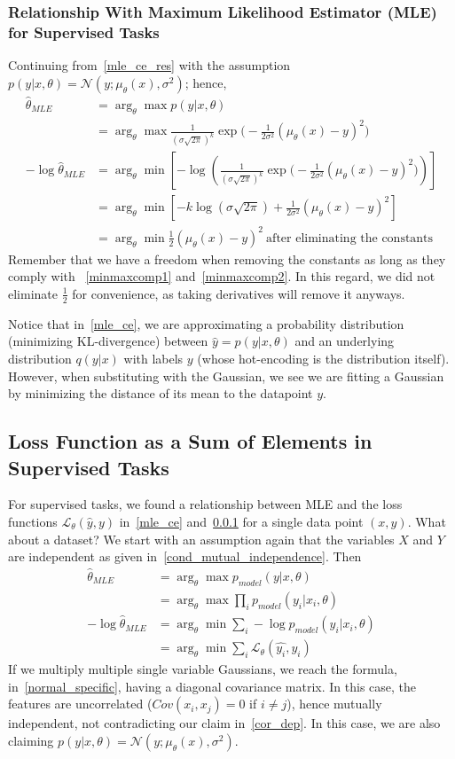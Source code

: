 \documentclass{article}
\numberwithin{equation}{subsection}
\begin{document}
\subsubsection{Relationship With Maximum Likelihood Estimator (MLE) for Supervised Tasks}
\label{mle_mse}
Continuing from~\ref{mle_ce_res} with the assumption $p(y|x,\theta) = \mathcal{N}(y; \mu_\theta(x),\sigma^2)$; hence, 
\begin{align}
    \hat{\theta}_{MLE} 
    &= \arg_\theta \max p(y|x,\theta)\\
    &= \arg_\theta \max \frac{1}{(\sigma\sqrt{2\pi})^k}\exp\Big(-\frac{1}{2\sigma^2}(\mu_\theta(x)-y)^2\Big)\\
    -\log\hat{\theta}_{MLE} &= \arg_\theta\min\left[-\log\left(\frac{1}{(\sigma\sqrt{2\pi})^k}\exp\Big(-\frac{1}{2\sigma^2}(\mu_\theta(x)-y)^2\Big)\right)\right]\\
    &= \arg_\theta\min[-k\log(\sigma\sqrt{2\pi}) + \frac{1}{2\sigma^2}(\mu_\theta(x)-y)^2]\\
    &= \arg_\theta \min\frac{1}{2}(\mu_\theta(x)-y)^2\ \text{after eliminating the constants}
    \label{mse_derivation_res1}
\end{align}
Remember that we have a freedom when removing the constants as long as they comply with ~\ref{minmaxcomp1} and~\ref{minmaxcomp2}. In this regard, we did not eliminate $\frac{1}{2}$ for convenience, as taking derivatives will remove it anyways. 

Notice that in~\ref{mle_ce}, we are approximating a probability distribution (minimizing KL-divergence) between $\hat{y} = p(y|x,\theta)$ and an underlying distribution $q(y|x)$ with labels $y$ (whose hot-encoding is the distribution itself). However, when substituting with the Gaussian, we see we are fitting a Gaussian by minimizing the distance of its mean to the datapoint $y$.  
\subsection{Loss Function as a Sum of Elements in Supervised Tasks}
For supervised tasks, we found a relationship between MLE and the loss functions $\mathcal{L}_\theta(\hat{y},y)$ in~\ref{mle_ce} and~\ref{mle_mse} for a single data point $(x,y)$. What about a dataset? We start with an assumption again that the variables $X$ and $Y$ are independent as given in~\ref{cond_mutual_independence}. Then 
\begin{align}
    \hat{\theta}_{MLE} 
    &= \arg_\theta \max p_{model}(y|x,\theta)\\
    &= \arg_\theta \max \prod_i p_{model}(y_i|x_i,\theta)\\
    -\log\hat{\theta}_{MLE}
    &= \arg_\theta \min \sum_i -\log p_{model}(y_i|x_i,\theta)\\
    &= \arg_\theta \min \sum_i \mathcal{L}_\theta(\hat{y_i},y_i)\label{loss_sum_res}
\end{align}
If we multiply multiple single variable Gaussians, we reach the formula, in~\ref{normal_specific}, having a diagonal covariance matrix. In this case, the features are uncorrelated ($Cov(x_i,x_j)=0$ if $i \neq j$), hence mutually independent, not contradicting our claim in~\ref{cor_dep}. In this case, we are also claiming $p(y|x,\theta)=\mathcal{N}(y; \mu_\theta(x),\sigma^2)$.
\end{document}

